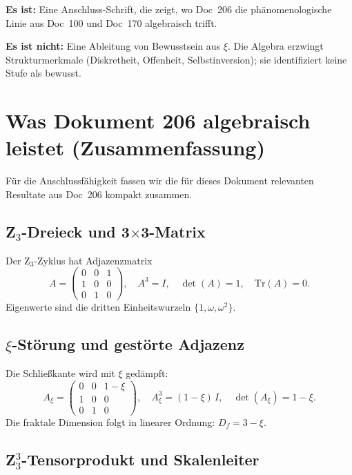 \begin{important}
\textbf{Es ist:} Eine Anschluss-Schrift, die zeigt, wo Doc~206 die phänomenologische Linie aus Doc~100 und Doc~170 algebraisch trifft.

\textbf{Es ist nicht:} Eine Ableitung von Bewusstsein aus $\xi$. Die Algebra erzwingt Strukturmerkmale (Diskretheit, Offenheit, Selbstinversion); sie identifiziert keine Stufe als \glqq bewusst\grqq{}.
\end{important}

\section{Was Dokument 206 algebraisch leistet (Zusammenfassung)}\label{sec:doc206_zusammenfassung}

Für die Anschlussfähigkeit fassen wir die für dieses Dokument relevanten Resultate aus Doc~206 kompakt zusammen.

\subsection{\texorpdfstring{Z$_3$-Dreieck und 3$\times$3-Matrix}{Z3-Dreieck und 3x3-Matrix}}

Der Z$_3$-Zyklus hat Adjazenzmatrix
\[
A = \begin{pmatrix} 0 & 0 & 1 \\ 1 & 0 & 0 \\ 0 & 1 & 0 \end{pmatrix},
\quad
A^3 = I, \quad \det(A) = 1, \quad \mathrm{Tr}(A) = 0.
\]
Eigenwerte sind die dritten Einheitswurzeln $\{1, \omega, \omega^2\}$.

\subsection{\texorpdfstring{$\xi$-Störung und gestörte Adjazenz}{xi-Störung und gestörte Adjazenz}}

Die Schließkante wird mit $\xi$ gedämpft:
\[
A_\xi = \begin{pmatrix} 0 & 0 & 1-\xi \\ 1 & 0 & 0 \\ 0 & 1 & 0 \end{pmatrix},
\quad
A_\xi^3 = (1-\xi)\,I, \quad \det(A_\xi) = 1-\xi.
\]
Die fraktale Dimension folgt in linearer Ordnung: $D_f = 3 - \xi$.

\subsection{\texorpdfstring{Z$_3^3$-Tensorprodukt und Skalenleiter}{Z3-hoch-3-Tensorprodukt und Skalenleiter}}

